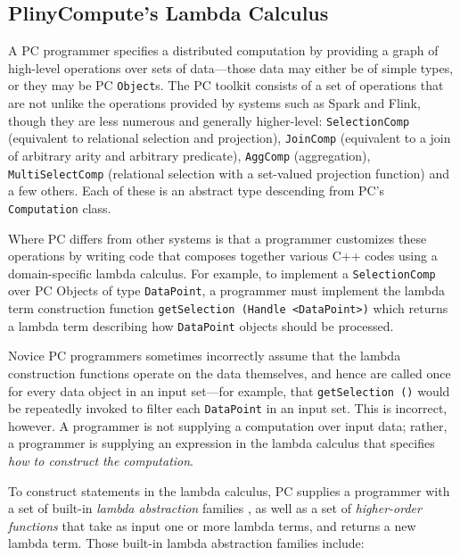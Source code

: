 \subsection{PlinyCompute's Lambda Calculus}
A PC programmer specifies a distributed computation by providing a graph of high-level operations over sets of data---those data
may either be of simple types, or they may be
PC \texttt{Object}s. The PC toolkit consists of a set of
operations 
that are not unlike the operations provided by systems such as Spark and Flink, though they are less numerous and generally higher-level:
\texttt{SelectionComp} (equivalent to relational selection and projection), \texttt{JoinComp} (equivalent to a join of arbitrary arity and arbitrary predicate), 
\texttt{AggComp} (aggregation), \texttt{MultiSelectComp} (relational selection with a set-valued projection function) and a few others.  
Each of these is an abstract type descending from PC's \texttt{Computation} class.

Where PC differs from other systems is that a programmer customizes these operations by writing code that composes together various C++ codes 
using a 
domain-specific lambda calculus.
For example, to implement a \texttt{SelectionComp} over PC Objects of type \texttt{DataPoint}, a programmer
must implement the lambda term construction function \texttt{getSelection (Handle <DataPoint>)} which returns a lambda term
describing how \texttt{DataPoint} objects
should be processed.

Novice PC programmers sometimes incorrectly assume that the lambda construction functions operate on the data themselves, and
hence are called once for every data object in an input set---for example, 
that
\texttt{getSelection ()} would be repeatedly invoked to filter each \texttt{DataPoint} in an input set.  
This is incorrect, however.
A programmer is not supplying a computation over input data; rather, a programmer is supplying an expression in the lambda calculus that 
specifies \emph{how to construct the computation}.

To construct statements in the lambda calculus, PC supplies a programmer with a set of built-in \emph{lambda abstraction} 
families \cite{miller1991logic}, as 
well as a set of \emph{higher-order functions} \cite{chen1993hilog}
that take as input one or more lambda terms, and returns a new lambda term.  Those built-in lambda abstraction families 
include:

